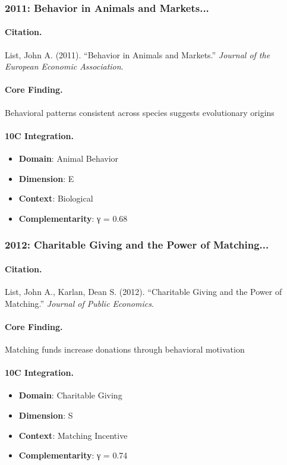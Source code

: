 \subsubsection{2011: Behavior in Animals and Markets...}

\paragraph{Citation.}
List, John A. (2011). ``Behavior in Animals and Markets.''
\textit{Journal of the European Economic Association}.

\paragraph{Core Finding.}
Behavioral patterns consistent across species suggests evolutionary origins

\paragraph{10C Integration.}
\begin{itemize}[nosep]
  \item \textbf{Domain}: Animal Behavior
  \item \textbf{Dimension}: E
  \item \textbf{Context}: Biological
  \item \textbf{Complementarity}: γ = 0.68
\end{itemize}


\subsubsection{2012: Charitable Giving and the Power of Matching...}

\paragraph{Citation.}
List, John A., Karlan, Dean S. (2012). ``Charitable Giving and the Power of Matching.''
\textit{Journal of Public Economics}.

\paragraph{Core Finding.}
Matching funds increase donations through behavioral motivation

\paragraph{10C Integration.}
\begin{itemize}[nosep]
  \item \textbf{Domain}: Charitable Giving
  \item \textbf{Dimension}: S
  \item \textbf{Context}: Matching Incentive
  \item \textbf{Complementarity}: γ = 0.74
\end{itemize}


